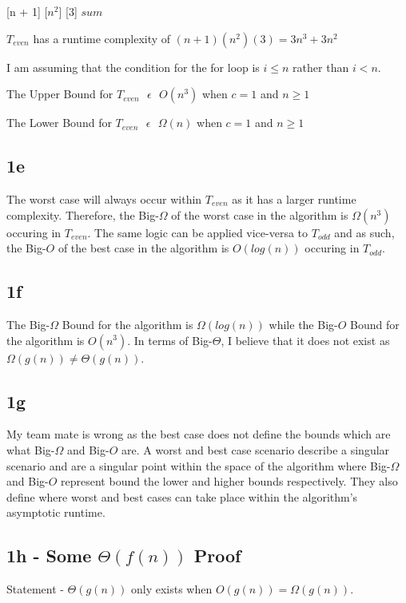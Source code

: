 \documentclass[oneside, a4paper]{article}
\begin{document}
\begin{algorithmic}
     [n + 1]
         [$n^2$]
             [3]
        \EndFor
    \EndFor
    \State \Return $sum$
    \EndFunction
\end{algorithmic}

$T_{even}$ has a runtime complexity of $(n+1)(n^2)(3) = 3n^3 + 3n^2$

I am assuming that the condition for the for loop is $i \leq n$ rather than $i < n$.  

The Upper Bound for $T_{even} \text{ } \epsilon \text{ } O(n^3)$ when $c = 1$ and $n \geq 1$

The Lower Bound for $T_{even} \text{ } \epsilon \text{ } \Omega(n)$ when $c = 1$ and $n \geq 1$ 

\subsection*{1e}
The worst case will always occur within $T_{even}$ as it has a larger runtime complexity. Therefore, the Big-$\Omega$ of the worst case in the algorithm is $\Omega(n^3)$ occuring in $T_{even}$. The same logic can be applied vice-versa to $T_{odd}$ and as such, the Big-$O$ of the best case in the algorithm is $O(log(n))$ occuring in $T_{odd}$.

\subsection*{1f}
The Big-$\Omega$ Bound for the algorithm is $\Omega(log(n))$ while the Big-$O$ Bound for the algorithm is $O(n^3)$. In terms of Big-$\Theta$, I believe that it does not exist as $\Omega(g(n)) \neq \Theta(g(n))$.


\subsection*{1g}
My team mate is wrong as the best case does not define the bounds which are what Big-$\Omega$ and Big-$O$ are. A worst and best case scenario describe a singular scenario and are a singular point within the space of the algorithm where Big-$\Omega$ and Big-$O$ represent bound the lower and higher bounds respectively. They also define where worst and best cases can take place within the algorithm's asymptotic runtime.
\subsection*{1h - Some $\Theta(f(n))$ Proof}
Statement - $\Theta(g(n))$ only exists when $O(g(n)) = \Omega(g(n))$. 
\end{document}
